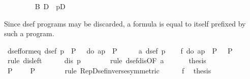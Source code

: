 \begin{isabellebody}
\ \ \ \ \ \ \isamarkupfalse%
\ {\isachardoublequote}{\isasymturnstile}\ B\ {\isasymlongrightarrow}\isactrlsub D\ {\isacharbrackleft}{\isacharhash}\ p{\isacharbrackright}D{\isachardoublequote}\ \isamarkupfalse%
\isacommand{{\isachardot}}\isanewline
\ \ \ \ \isamarkupfalse%
\isanewline
\ \ \isamarkupfalse%
\isanewline
\isamarkupfalse%
\isamarkupfalse%
%
\begin{isamarkuptext}%
Since dsef programs may be discarded, a formula is equal to itself prefixed
  by such a program.%
\end{isamarkuptext}%
\isamarkuptrue%
\ dsef{\isacharunderscore}form{\isacharunderscore}eq{\isacharcolon}\ {\isachardoublequote}dsef\ p\ {\isasymLongrightarrow}\ P\ {\isacharequal}\ {\isasymUp}\ {\isacharparenleft}do\ {\isacharbraceleft}a{\isasymleftarrow}p{\isacharsemicolon}\ {\isasymDown}\ P{\isacharbraceright}{\isacharparenright}{\isachardoublequote}\isanewline
\isamarkupfalse%
\ {\isacharminus}\isanewline
\ \ \isamarkupfalse%
\ a{}{\isacharcolon}\ {\isachardoublequote}dsef\ p{\isachardoublequote}\isanewline
\ \ \isamarkupfalse%
\ f{}{\isacharcolon}\ {\isachardoublequote}do\ {\isacharbraceleft}a{\isasymleftarrow}p{\isacharsemicolon}\ {\isasymDown}\ P{\isacharbraceright}\ {\isacharequal}\ {\isasymDown}\ P{\isachardoublequote}\isanewline
\ \ \isamarkupfalse%
\ {\isacharparenleft}rule\ dis{\isacharunderscore}left{}{\isacharparenright}\isanewline
\ \ \ \ \isamarkupfalse%
\ {\isachardoublequote}dis\ p{\isachardoublequote}\isanewline
\ \ \ \ \ \ \isamarkupfalse%
\ {\isacharparenleft}rule\ dsef{\isacharunderscore}dis{\isacharbrackleft}OF\ a{}{\isacharbrackright}{\isacharparenright}\isanewline
\ \ \isamarkupfalse%
\isanewline
\ \ \isamarkupfalse%
\ {\isacharquery}thesis\ \isanewline
\ \ \isamarkupfalse%
\ {\isacharminus}\isanewline
\ \ \ \ \isamarkupfalse%
\ {\isachardoublequote}P\ \ {\isacharequal}\ {\isasymUp}\ {\isacharparenleft}{\isasymDown}\ P{\isacharparenright}{\isachardoublequote}\isanewline
\ \ \ \ \ \ \isamarkupfalse%
\ {\isacharparenleft}rule\ Rep{\isacharunderscore}Dsef{\isacharunderscore}inverse{\isacharbrackleft}symmetric{\isacharbrackright}{\isacharparenright}\isanewline
\ \ \ \ \isamarkupfalse%
\ f{}\ \isamarkupfalse%
\ {\isacharquery}thesis\ \isamarkupfalse%

\end{isabellebody}

